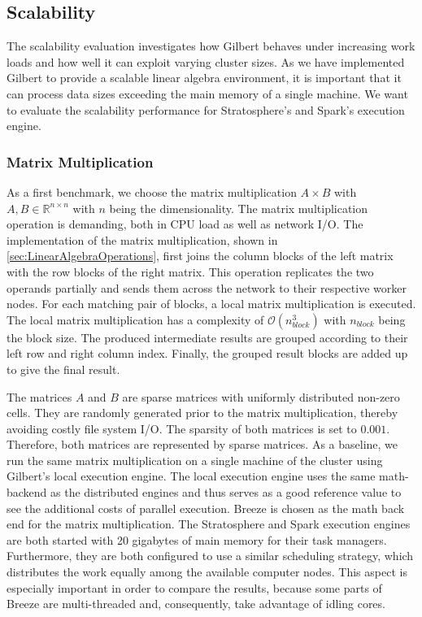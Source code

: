 \subsection{Scalability}

The scalability evaluation investigates how Gilbert behaves under increasing work loads and how well it can exploit varying cluster sizes.
As we have implemented Gilbert to provide a scalable linear algebra environment, it is important that it can process data sizes exceeding the main memory of a single machine.
We want to evaluate the scalability performance for Stratosphere's and Spark's execution engine.

\subsubsection{Matrix Multiplication}
\label{subsec:mm}

As a first benchmark, we choose the matrix multiplication $A\times B$ with $A,B \in \mathbb{R}^{n\times n}$ with $n$ being the dimensionality.
The matrix multiplication operation is demanding, both in CPU load as well as network I/O.
The implementation of the matrix multiplication, shown in \cref{sec:LinearAlgebraOperations}, first joins the column blocks of the left matrix with the row blocks of the right matrix.
This operation replicates the two operands partially and sends them across the network to their respective worker nodes.
For each matching pair of blocks, a local matrix multiplication is executed.
The local matrix multiplication has a complexity of $\mathcal{O}(n_{block}^3)$ with $n_{block}$ being the block size.
The produced intermediate results are grouped according to their left row and right column index.
Finally, the grouped result blocks are added up to give the final result.

The matrices $A$ and $B$ are sparse matrices with uniformly distributed non-zero cells.
They are randomly generated prior to the matrix multiplication, thereby avoiding costly file system I/O.
The sparsity of both matrices is set to $0.001$.
Therefore, both matrices are represented by sparse matrices.
As a baseline, we run the same matrix multiplication on a single machine of the cluster using Gilbert's local execution engine.
The local execution engine uses the same math-backend as the distributed engines and thus serves as a good reference value to see the additional costs of parallel execution.
Breeze is chosen as the math back end for the matrix multiplication.
The Stratosphere and Spark execution engines are both started with 20 gigabytes of main memory for their task managers.
Furthermore, they are both configured to use a similar scheduling strategy, which distributes the work equally among the available computer nodes.
This aspect is especially important in order to compare the results, because some parts of Breeze are multi-threaded and, consequently, take advantage of idling cores.

